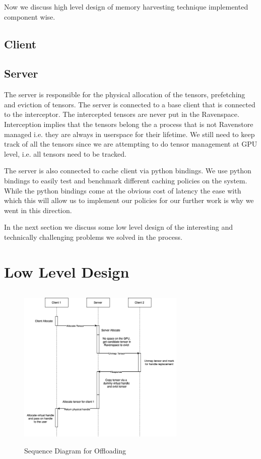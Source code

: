 \documentclass{article}
\begin{document}
Now we discuss high level design of memory harvesting technique implemented component wise.

\subsection{Client}


\subsection{Server}
The server is responsible for the physical allocation of the tensors, prefetching and eviction of tensors.
The server is connected to a base client that is connected to the interceptor. The intercepted tensors are
never put in the Ravenspace. Interception implies that the tensors belong the a process that is not Ravenstore managed i.e.
they are always in userspace for their lifetime.
We still need to keep track of all the tensors since we are attempting to do tensor management at GPU level, i.e. all tensors
need to be tracked.

The server is also connected to cache client via python bindings. We use python bindings to easily test and benchmark different
caching policies on the system. While the python bindings come at the obvious cost of latency the ease with which this will allow us 
to implement our policies for our further work is why we went in this direction.

In the next section we discuss some low level design of the interesting and technically
challenging problems we solved in the process.



\section{Low Level Design}
\begin{figure}[!htbp]
	\centering
	\includegraphics[height=8cm, width=8cm]{figures/Offloading.drawio.png}
	\caption{Sequence Diagram for Offloading}
\end{figure}
\FloatBarrier
\end{document}
